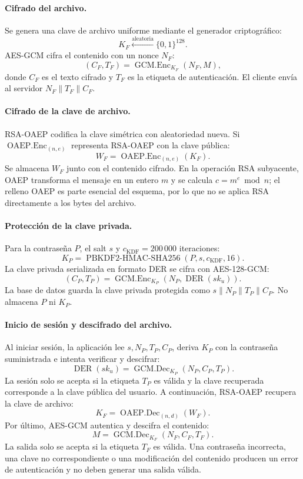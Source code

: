 \documentclass[12pt,a4paper]{article}
\begin{document}
\paragraph{Cifrado del archivo.}
Se genera una clave de archivo uniforme mediante el generador criptográfico:
\[
K_F \xleftarrow{\text{aleatoria}} \{0,1\}^{128}.
\]
AES-GCM cifra el contenido con un nonce $N_F$:
\[
(C_F,T_F)=\operatorname{GCM.Enc}_{K_F}(N_F,M),
\]
donde $C_F$ es el texto cifrado y $T_F$ es la etiqueta de autenticación. El cliente envía al servidor $N_F\parallel T_F\parallel C_F$.

\paragraph{Cifrado de la clave de archivo.}
RSA-OAEP codifica la clave simétrica con aleatoriedad nueva. Si $\operatorname{OAEP.Enc}_{(n,e)}$ representa RSA-OAEP con la clave pública:
\[
W_F=\operatorname{OAEP.Enc}_{(n,e)}(K_F).
\]
Se almacena $W_F$ junto con el contenido cifrado. En la operación RSA subyacente, OAEP transforma el mensaje en un entero $m$ y se calcula $c=m^e\bmod n$; el relleno OAEP es parte esencial del esquema, por lo que no se aplica RSA directamente a los bytes del archivo.

\paragraph{Protección de la clave privada.}
Para la contraseña $P$, el salt $s$ y $c_{\mathrm{KDF}}=200\,000$ iteraciones:
\[
K_P=\operatorname{PBKDF2\text{-}HMAC\text{-}SHA256}
    (P,s,c_{\mathrm{KDF}},16).
\]
La clave privada serializada en formato DER se cifra con AES-128-GCM:
\[
(C_P,T_P)=\operatorname{GCM.Enc}_{K_P}(N_P,\operatorname{DER}(sk_u)).
\]
La base de datos guarda la clave privada protegida como
$s\parallel N_P\parallel T_P\parallel C_P$. No almacena $P$ ni $K_P$.

\paragraph{Inicio de sesión y descifrado del archivo.}
Al iniciar sesión, la aplicación lee $s,N_P,T_P,C_P$, deriva $K_P$ con la contraseña suministrada e intenta verificar y descifrar:
\[
\operatorname{DER}(sk_u)=
\operatorname{GCM.Dec}_{K_P}(N_P,C_P,T_P).
\]
La sesión solo se acepta si la etiqueta $T_P$ es válida y la clave recuperada corresponde a la clave pública del usuario. A continuación, RSA-OAEP recupera la clave de archivo:
\[
K_F=\operatorname{OAEP.Dec}_{(n,d)}(W_F).
\]
Por último, AES-GCM autentica y descifra el contenido:
\[
M=\operatorname{GCM.Dec}_{K_F}(N_F,C_F,T_F).
\]
La salida solo se acepta si la etiqueta $T_F$ es válida. Una contraseña incorrecta, una clave no correspondiente o una modificación del contenido producen un error de autenticación y no deben generar una salida válida.
\end{document}

